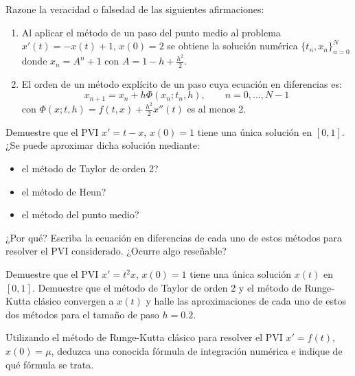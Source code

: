 \begin{ejercicio}\label{ej:3.1.6}
    Razone la veracidad o falsedad de las siguientes afirmaciones:
    \begin{enumerate}
        \item Al aplicar el método de un paso del punto medio al problema $x'(t) = -x(t) + 1$, $x(0) = 2$ se obtiene la solución numérica $\{t_n, x_n\}_{n=0}^N$ donde $x_n = A^n + 1$ con $A = 1 - h + \frac{h^2}{2}$.
        \item El orden de un método explícito de un paso cuya ecuación en diferencias es:
        \begin{equation*}
            x_{n+1} = x_n + h \Phi(x_n; t_n, h),\qquad n = 0, \ldots, N-1
        \end{equation*}
        con $\Phi(x; t, h) = f(t, x) + \frac{h^2}{2} x''(t)$ es al menos 2.
    \end{enumerate}
\end{ejercicio}

\begin{ejercicio}\label{ej:3.1.7}
    Demuestre que el PVI $x' = t - x$, $x(0) = 1$ tiene una única solución en $[0, 1]$. ¿Se puede aproximar dicha solución mediante:
    \begin{itemize}
        \item el método de Taylor de orden 2?
        \item el método de Heun?
        \item el método del punto medio?
    \end{itemize}
    ¿Por qué? Escriba la ecuación en diferencias de cada uno de estos métodos para resolver el PVI considerado. ¿Ocurre algo reseñable?
\end{ejercicio}

\begin{ejercicio}\label{ej:3.1.8}
    Demuestre que el PVI $x' = t^2 x$, $x(0) = 1$ tiene una única solución $x(t)$ en $[0, 1]$. Demuestre que el método de Taylor de orden 2 y el método de Runge-Kutta clásico convergen a $x(t)$ y halle las aproximaciones de cada uno de estos dos métodos para el tamaño de paso $h = 0.2$.
\end{ejercicio}

\begin{ejercicio}\label{ej:3.1.9}
    Utilizando el método de Runge-Kutta clásico para resolver el PVI $x' = f(t)$, $x(0) = \mu$, deduzca una conocida fórmula de integración numérica e indique de qué fórmula se trata.
\end{ejercicio}

